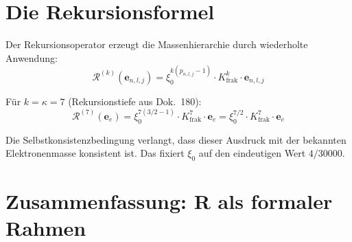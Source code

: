 \section{Die Rekursionsformel}

Der Rekursionsoperator erzeugt die Massenhierarchie durch wiederholte
Anwendung:
\begin{equation}
  \mathcal{R}^{(k)}(\mathbf{e}_{n,l,j})
  = \xi_0^{k(p_{n,l,j}-1)} \cdot K_{\text{frak}}^k
  \cdot \mathbf{e}_{n,l,j}
  \label{eq:rekursion-k}
\end{equation}

Für $k = \kappa = 7$ (Rekursionstiefe aus Dok.~180):
\begin{equation}
  \mathcal{R}^{(7)}(\mathbf{e}_e) = \xi_0^{7(3/2-1)} \cdot K_{\text{frak}}^7
  \cdot \mathbf{e}_e
  = \xi_0^{7/2} \cdot K_{\text{frak}}^7 \cdot \mathbf{e}_e
\end{equation}

Die Selbstkonsistenzbedingung verlangt, dass dieser Ausdruck mit der
bekannten Elektronenmasse konsistent ist. Das fixiert $\xi_0$
auf den eindeutigen Wert $4/30000$.

\section{Zusammenfassung: R als formaler Rahmen}

\begin{center}
{\footnotesize
{}
}
\end{center}


